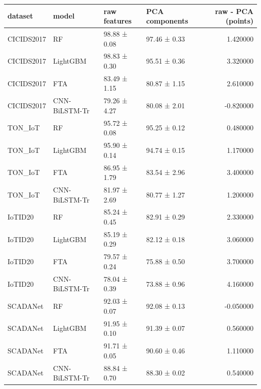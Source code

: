 \begin{tabular}{llllr}
\toprule
dataset & model & raw features & PCA components & raw - PCA (points) \\
\midrule
CICIDS2017 & RF & 98.88 ± 0.08 & 97.46 ± 0.33 & 1.420000 \\
CICIDS2017 & LightGBM & 98.83 ± 0.30 & 95.51 ± 0.36 & 3.320000 \\
CICIDS2017 & FTA & 83.49 ± 1.15 & 80.87 ± 1.15 & 2.610000 \\
CICIDS2017 & CNN-BiLSTM-Tr & 79.26 ± 4.27 & 80.08 ± 2.01 & -0.820000 \\
TON\_IoT & RF & 95.72 ± 0.08 & 95.25 ± 0.12 & 0.480000 \\
TON\_IoT & LightGBM & 95.90 ± 0.14 & 94.74 ± 0.15 & 1.170000 \\
TON\_IoT & FTA & 86.95 ± 1.79 & 83.54 ± 2.96 & 3.400000 \\
TON\_IoT & CNN-BiLSTM-Tr & 81.97 ± 2.69 & 80.77 ± 1.27 & 1.200000 \\
IoTID20 & RF & 85.24 ± 0.45 & 82.91 ± 0.29 & 2.330000 \\
IoTID20 & LightGBM & 85.19 ± 0.29 & 82.12 ± 0.18 & 3.060000 \\
IoTID20 & FTA & 79.57 ± 0.24 & 75.88 ± 0.50 & 3.700000 \\
IoTID20 & CNN-BiLSTM-Tr & 78.04 ± 0.39 & 73.88 ± 0.96 & 4.160000 \\
SCADANet & RF & 92.03 ± 0.07 & 92.08 ± 0.13 & -0.050000 \\
SCADANet & LightGBM & 91.95 ± 0.10 & 91.39 ± 0.07 & 0.560000 \\
SCADANet & FTA & 91.71 ± 0.05 & 90.60 ± 0.46 & 1.110000 \\
SCADANet & CNN-BiLSTM-Tr & 88.84 ± 0.70 & 88.30 ± 0.02 & 0.540000 \\
\bottomrule
\end{tabular}

